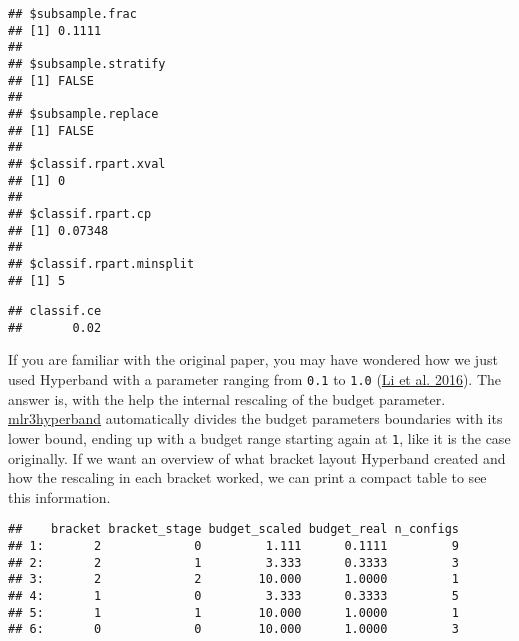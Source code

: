 \documentclass[
]{scrbook}
\newenvironment{Shaded}{\begin{snugshade}}{\end{snugshade}}
\newcommand{\FunctionTok}[1]{\textcolor[rgb]{0.00,0.00,0.00}{#1}}
\newcommand{\NormalTok}[1]{#1}
\newcommand{\SpecialCharTok}[1]{\textcolor[rgb]{0.00,0.00,0.00}{#1}}
\renewenvironment{Shaded} {\begin{snugshade}\small} {\end{snugshade}}
\begin{document}
\begin{Shaded}
\end{Shaded}

\begin{verbatim}
## $subsample.frac
## [1] 0.1111
## 
## $subsample.stratify
## [1] FALSE
## 
## $subsample.replace
## [1] FALSE
## 
## $classif.rpart.xval
## [1] 0
## 
## $classif.rpart.cp
## [1] 0.07348
## 
## $classif.rpart.minsplit
## [1] 5
\end{verbatim}

\begin{Shaded}
\end{Shaded}

\begin{verbatim}
## classif.ce 
##       0.02
\end{verbatim}

If you are familiar with the original paper, you may have wondered how we just used Hyperband with a parameter ranging from \texttt{0.1} to \texttt{1.0} (\protect\hyperlink{ref-Li2016}{Li et al. 2016}).
The answer is, with the help the internal rescaling of the budget parameter.
\href{https://mlr3hyperband.mlr-org.com}{mlr3hyperband} automatically divides the budget parameters boundaries with its lower bound, ending up with a budget range starting again at \texttt{1}, like it is the case originally.
If we want an overview of what bracket layout Hyperband created and how the rescaling in each bracket worked, we can print a compact table to see this information.

\begin{Shaded}
\end{Shaded}

\begin{verbatim}
##    bracket bracket_stage budget_scaled budget_real n_configs
## 1:       2             0         1.111      0.1111         9
## 2:       2             1         3.333      0.3333         3
## 3:       2             2        10.000      1.0000         1
## 4:       1             0         3.333      0.3333         5
## 5:       1             1        10.000      1.0000         1
## 6:       0             0        10.000      1.0000         3
\end{verbatim}
\end{document}
